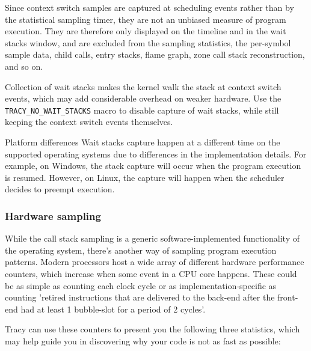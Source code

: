 \documentclass[hidelinks,titlepage,a4paper,twoside]{article}
\begin{document}
Since context switch samples are captured at scheduling events rather than by the statistical sampling timer, they are not an unbiased measure of program execution. They are therefore only displayed on the timeline and in the wait stacks window, and are excluded from the sampling statistics, the per-symbol sample data, child calls, entry stacks, flame graph, zone call stack reconstruction, and so on.

Collection of wait stacks makes the kernel walk the stack at context switch events, which may add considerable overhead on weaker hardware. Use the \texttt{TRACY\_NO\_WAIT\_STACKS} macro to disable capture of wait stacks, while still keeping the context switch events themselves.

\begin{bclogo}[
noborder=true,
couleur=black!5,
logo=\bcattention
]{Platform differences}
Wait stacks capture happen at a different time on the supported operating systems due to differences in the implementation details. For example, on Windows, the stack capture will occur when the program execution is resumed. However, on Linux, the capture will happen when the scheduler decides to preempt execution.
\end{bclogo}

\subsubsection{Hardware sampling}
\label{hardwaresampling}

While the call stack sampling is a generic software-implemented functionality of the operating system, there's another way of sampling program execution patterns. Modern processors host a wide array of different hardware performance counters, which increase when some event in a CPU core happens. These could be as simple as counting each clock cycle or as implementation-specific as counting 'retired instructions that are delivered to the back-end after the front-end had at least 1 bubble-slot for a period of 2 cycles'.

Tracy can use these counters to present you the following three statistics, which may help guide you in discovering why your code is not as fast as possible:
\end{document}
